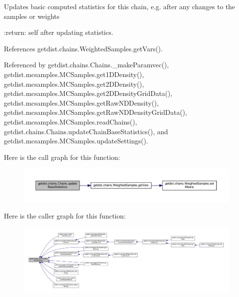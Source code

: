 \begin{DoxyVerb}Updates basic computed statistics for this chain, e.g. after any changes to the samples or weights

:return: self after updating statistics.
\end{DoxyVerb}
 

References getdist.\+chains.\+Weighted\+Samples.\+get\+Vars().



Referenced by getdist.\+chains.\+Chains.\+\_\+make\+Paramvec(), getdist.\+mcsamples.\+M\+C\+Samples.\+get1\+D\+Density(), getdist.\+mcsamples.\+M\+C\+Samples.\+get2\+D\+Density(), getdist.\+mcsamples.\+M\+C\+Samples.\+get2\+D\+Density\+Grid\+Data(), getdist.\+mcsamples.\+M\+C\+Samples.\+get\+Raw\+N\+D\+Density(), getdist.\+mcsamples.\+M\+C\+Samples.\+get\+Raw\+N\+D\+Density\+Grid\+Data(), getdist.\+mcsamples.\+M\+C\+Samples.\+read\+Chains(), getdist.\+chains.\+Chains.\+update\+Chain\+Base\+Statistics(), and getdist.\+mcsamples.\+M\+C\+Samples.\+update\+Settings().

Here is the call graph for this function\+:
\nopagebreak
\begin{figure}[H]
\begin{center}
\leavevmode
\includegraphics[width=350pt]{classgetdist_1_1chains_1_1Chains_a2707ea98f828744379464c54a693d906_cgraph}
\end{center}
\end{figure}
Here is the caller graph for this function\+:
\nopagebreak
\begin{figure}[H]
\begin{center}
\leavevmode
\includegraphics[width=350pt]{classgetdist_1_1chains_1_1Chains_a2707ea98f828744379464c54a693d906_icgraph}
\end{center}
\end{figure}
\mbox{\label{classgetdist_1_1chains_1_1Chains_a29e10cc055140e1f5639b8ff9331b1c4}} 
